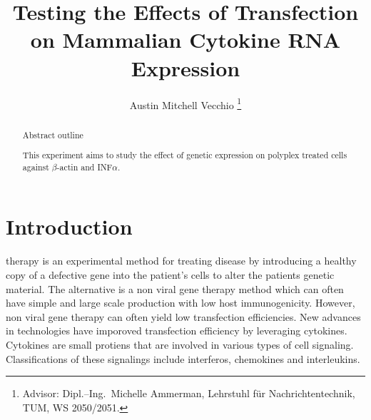 \documentclass[journal, a4paper]{IEEEtran}
\begin{document}
\title{Testing the Effects of Transfection on Mammalian Cytokine RNA Expression}
\author{Austin Mitchell Vecchio
\thanks{Advisor: Dipl.--Ing.~Michelle Ammerman, Lehrstuhl f\"ur Nachrichtentechnik, TUM, WS 2050/2051.}}
\maketitle

\begin{abstract}
  Abstract outline

  This experiment aims to study the effect of genetic expression on polyplex treated cells against $\beta$-actin and INF$\alpha$.

\end{abstract}

\section{Introduction}
   therapy is an experimental method for treating disease by introducing a healthy copy of a
  defective gene into the patient's cells to alter the patients genetic material.
  The alternative is a non viral gene therapy method which can often have simple and large scale production
  with low host immunogenicity. However, non viral gene therapy can often yield low transfection efficiencies.
  New advances in technologies have imporoved transfection efficiency by leveraging cytokines. Cytokines
  are small protiens that are involved in various types of cell signaling. Classifications of these signalings
  include interferos, chemokines and interleukins.


\end{document}
